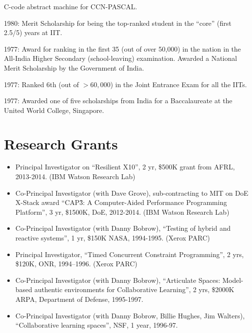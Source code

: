 \documentclass{article}
\begin{document}
\begin{description}
      C-code abstract machine for CCN-PASCAL. 
\item{1980:} Merit Scholarship for being the top-ranked student in the
      ``core'' (first 2.5/5) years  at IIT. 
\item{1977:}  Award for ranking in the first 35 (out of over 50,000) in 
      the nation in the All-India Higher Secondary (school-leaving)
      examination. Awarded a National Merit Scholarship by the
      Government of India. 
\item{1977:} Ranked 6th (out of $> 60,000$) in the Joint Entrance Exam
      for all the IITs.  
\item{1977:} Awarded one of five scholarships from India for
      a Baccalaureate at the United World College, Singapore.  
\end{description}

\section*{Research Grants}
\begin{itemize}
\item Principal Investigator on ``Resilient X10'', 2 yr, \$500K grant
  from AFRL, 2013-2014. (IBM Watson Research Lab)
\item   Co-Principal Investigator (with Dave Grove), sub-contracting
  to MIT on DoE X-Stack award ``CAP\^3:  A Computer-Aided Performance
  Programming Platform'', 3 yr, \$1500K, DoE, 2012-2014. (IBM Watson
  Research Lab)

\item   Co-Principal Investigator (with Danny Bobrow), ``Testing of hybrid
   and reactive systems'', 1 yr, \$150K NASA, 1994-1995. (Xerox PARC)

\item   Principal Investigator, ``Timed Concurrent Constraint
   Programming'', 2 yrs, \$120K, ONR, 1994--1996.  (Xerox PARC)

\item   Co-Principal Investigator (with Danny Bobrow), ``Articulate Spaces:
   Model-based authentic environments for Collaborative Learning'', 2
   yrs, \$2000K ARPA, Department of Defense, 1995-1997.

\item   Co-Principal Investigator (with Danny Bobrow, Billie Hughes, Jim
   Walters), ``Collaborative learning spaces'', NSF, 1 year, 1996-97.
\end{itemize}
\end{document}
